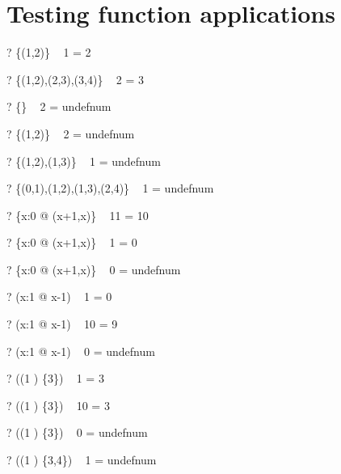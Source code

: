 \documentclass{article}
\begin{document}
\section{Testing function applications}
\begin{zed} \vdash? \{(1,2)\} ~ 1 = 2 \end{zed}
\begin{zed} \vdash? \{(1,2),(2,3),(3,4)\} ~ 2 = 3 \end{zed}
\begin{zed} \vdash? \{\} ~ 2 = undefnum \end{zed}
\begin{zed} \vdash? \{(1,2)\} ~ 2 = undefnum \end{zed}
\begin{zed} \vdash? \{(1,2),(1,3)\} ~ 1 = undefnum \end{zed}
\begin{zed} \vdash? \{(0,1),(1,2),(1,3),(2,4)\} ~ 1 = undefnum \end{zed}
\begin{zed} \vdash?  \{x:0  @ (x+1,x)\} ~ 11 = 10 \end{zed}
\begin{zed} \vdash?  \{x:0  @ (x+1,x)\} ~ 1 = 0 \end{zed}
\begin{zed} \vdash? \{x:0  @ (x+1,x)\} ~ 0 = undefnum \end{zed}
\begin{zed} \vdash?  (\lambda x:1  @ x-1) ~ 1 = 0 \end{zed}
\begin{zed} \vdash?  (\lambda x:1  @ x-1) ~ 10 = 9 \end{zed}
\begin{zed} \vdash? (\lambda x:1  @ x-1) ~ 0 = undefnum \end{zed}
\begin{zed} \vdash?   ((1 ) \cross \{3\}) ~ 1 = 3 \end{zed}
\begin{zed} \vdash?   ((1 ) \cross \{3\}) ~ 10 = 3 \end{zed}
\begin{zed} \vdash?  ((1 ) \cross \{3\}) ~ 0 = undefnum \end{zed}
\begin{zed} \vdash?  ((1 ) \cross \{3,4\}) ~ 1 = undefnum \end{zed}
\end{document}
